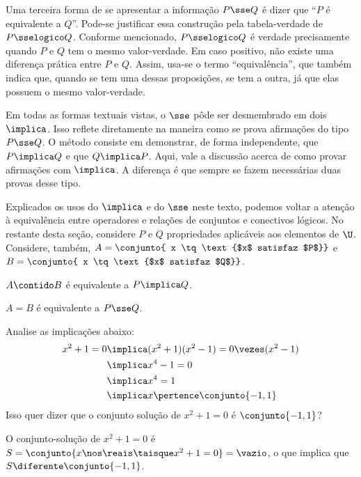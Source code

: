 Uma terceira forma de se apresentar a informação $P \sse Q$ é dizer que ``$P$ é equivalente a $Q$''. Pode-se justificar essa construção pela tabela-verdade de $P \sselogico Q$. Conforme mencionado, $P \sselogico Q$ é verdade precisamente quando $P$ e $Q$ tem o mesmo valor-verdade. Em caso positivo, não existe uma diferença prática entre $P$ e $Q$. Assim, usa-se o termo ``equivalência'', que também indica que, quando se tem uma dessas proposições, se tem a outra, já que elas possuem o mesmo valor-verdade.

Em todas as formas textuais vistas, o $\sse$ pôde ser desmembrado em dois $\implica$. Isso reflete diretamente na maneira como se prova afirmações do tipo $P \sse Q$. O método consiste em demonstrar, de forma independente, que $P \implica Q$ e que $Q \implica P$. Aqui, vale a discussão acerca de como provar afirmações com $\implica$. A diferença é que sempre se fazem necessárias duas provas desse tipo.

Explicados os usos do $\implica$  e do $\sse$ neste texto, podemos voltar a atenção à equivalência entre operadores e relações de conjuntos e conectivos lógicos. No restante desta seção, considere $P$ e $Q$ propriedades aplicáveis aos elementos de $\U$. Considere, também, $A = \conjunto{ x \tq \text{$x$ satisfaz $P$}}$ e $B = \conjunto{ x \tq \text{$x$ satisfaz $Q$}}$.

\begin{proposition} 
	$A \contido B$ é equivalente a $P \implica Q$.
\end{proposition}

\begin{proposition} 
	$A = B$ é equivalente a $P \sse Q$.
\end{proposition}

\begin{example}
	Analise as implicações abaixo:
	\begin{align*}
        x^2+1=0 &\implica (x^2+1)(x^2-1) = 0 \vezes (x^2-1) \\
                &\implica x^4 - 1 = 0 \\
                &\implica x^4 = 1 \\
                &\implica x \pertence \conjunto {-1, 1}
	\end{align*}
	Isso quer dizer que o conjunto solução de $x^2 +1 = 0$ é $\conjunto{-1, 1}$?
\end{example}

\begin{solution}
	O conjunto-solução de $x^2 + 1 = 0$ é $S = \conjunto{ x \nos \reais \taisque x^2 + 1 = 0} = \vazio$, o que implica que $S \diferente \conjunto{-1, 1}$.
\end{solution}

